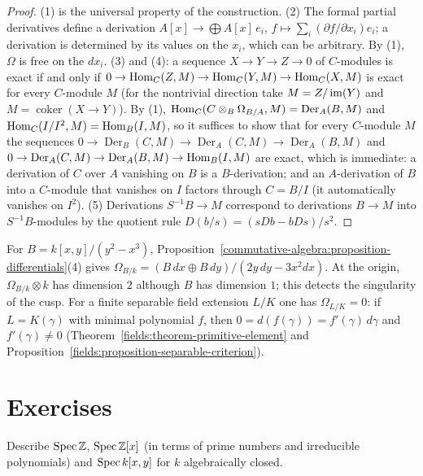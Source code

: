 \begin{proof}
(1) is the universal property of the construction. (2) The formal partial derivatives define a derivation
$A[x] \to \bigoplus A[x]\,e_i$, $f \mapsto \sum_i(\partial f/\partial x_i)e_i$; a derivation is determined by its values on the $x_i$, which can be
arbitrary. By (1), $\Omega$ is free on the $dx_i$.
(3) and (4): a sequence $X \to Y \to Z \to 0$ of $C$-modules is exact if and only if
$0 \to \operatorname{Hom}_C(Z, M) \to \operatorname{Hom}_C(Y, M) \to \operatorname{Hom}_C(X, M)$ is exact for every $C$-module $M$ (for the nontrivial direction take $M = Z/\operatorname{im}(Y)$
and $M = \operatorname{coker}(X \to Y)$). By (1), $\operatorname{Hom}_C(C \otimes_B \Omega_{B/A}, M) = \operatorname{Der}_A(B, M)$ and
$\operatorname{Hom}_C(I/I^2, M) = \operatorname{Hom}_B(I, M)$, so it suffices to show that for every $C$-module $M$ the sequences $0 \to \operatorname{Der}_B(C, M) \to \operatorname{Der}_A(C, M) \to \operatorname{Der}_A(B, M)$ and
$0 \to \operatorname{Der}_A(C, M) \to \operatorname{Der}_A(B, M) \to \operatorname{Hom}_B(I, M)$ are exact, which is immediate: a derivation of $C$ over $A$ vanishing on $B$
is a $B$-derivation; and an $A$-derivation of $B$ into a $C$-module that vanishes on $I$ factors through $C = B/I$ (it
automatically vanishes on $I^2$).
(5) Derivations $S^{-1}B \to M$ correspond to derivations $B \to M$ into $S^{-1}B$-modules by the quotient rule
$D(b/s) = (sDb - bDs)/s^2$.
\end{proof}

\begin{example}\label{commutative-algebra:example-cusp}
For $B = k[x, y]/(y^2 - x^3)$, Proposition~\ref{commutative-algebra:proposition-differentials}(4) gives
$\Omega_{B/k} = (B\,dx \oplus B\,dy)/(2y\,dy - 3x^2dx)$. At the origin, $\Omega_{B/k} \otimes k$ has dimension $2$ although $B$ has
dimension $1$; this detects the singularity of the cusp. For a finite separable field extension $L/K$ one has $\Omega_{L/K} = 0$: if
$L = K(\gamma)$ with minimal polynomial $f$, then $0 = d(f(\gamma)) = f'(\gamma)\,d\gamma$ and $f'(\gamma) \neq 0$
(Theorem~\ref{fields:theorem-primitive-element} and Proposition~\ref{fields:proposition-separable-criterion}).
\end{example}

\section{Exercises}\label{commutative-algebra:section-exercises}

\begin{exercise}\label{commutative-algebra:exercise-spec-z}
Describe $\operatorname{Spec}\mathbb{Z}$, $\operatorname{Spec}\mathbb{Z}[x]$ (in terms of prime numbers and irreducible polynomials) and $\operatorname{Spec} k[x, y]$ for $k$
algebraically closed.
\end{exercise}


